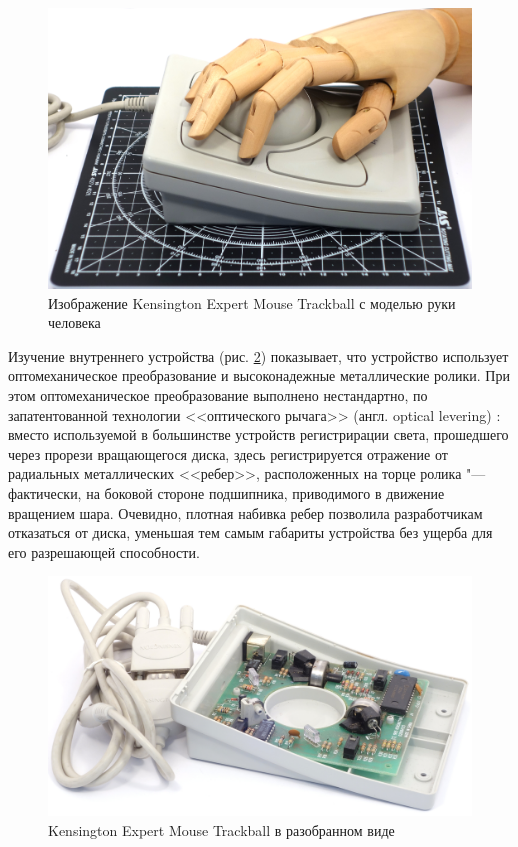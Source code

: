 \documentclass[11pt, a4paper]{article}
\begin{document}
\begin{figure}[h]
    \centering
    \includegraphics[scale=0.3]{1996_kensington_expert_trackball_5/hand_30.jpg}
    \caption{Изображение Kensington Expert Mouse Trackball с моделью руки человека}
    \label{fig:ExpertMouseHand}
\end{figure}

Изучение внутреннего устройства (рис. \ref{fig:ExpertMouseInside}) показывает, что устройство использует  оптомеханическое преобразование и высоконадежные металлические ролики. При этом оптомеханическое преобразование выполнено нестандартно, по запатентованной технологии <<оптического рычага>> (англ. optical levering) \cite{eu}: вместо используемой в большинстве устройств регистрирации света, прошедшего через прорези вращающегося диска, здесь регистрируется отражение от радиальных металлических <<ребер>>, расположенных на торце ролика "--- фактически, на боковой стороне подшипника, приводимого в движение вращением шара. Очевидно, плотная набивка ребер позволила разработчикам отказаться от диска, уменьшая тем самым габариты устройства без ущерба для его разрешающей способности. 

\begin{figure}[h]
    \centering
    \includegraphics[scale=0.65]{1996_kensington_expert_trackball_5/inside_60.jpg}
    \caption{Kensington Expert Mouse Trackball в разобранном виде}
    \label{fig:ExpertMouseInside}
\end{figure}
\end{document}
